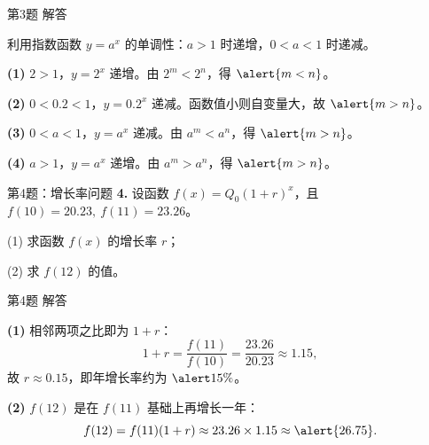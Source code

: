 \documentclass[10pt,aspectratio=169,serif,fleqn]{ctexbeamer}
\begin{document}
\begin{frame}[t]{第3题 解答}
\begin{tcolorbox}[colback=xyyg_orange!5,colframe=xyyg_orange,title=\textbf{解}]
利用指数函数 $y=a^{x}$ 的单调性：$a>1$ 时递增，$0<a<1$ 时递减。

\vspace{0.4em}
\textbf{(1)} $2>1$，$y=2^{x}$ 递增。由 $2^{m}<2^{n}$，得 $\alert{m<n}$。

\vspace{0.4em}
\textbf{(2)} $0<0.2<1$，$y=0.2^{x}$ 递减。函数值小则自变量大，故 $\alert{m>n}$。

\vspace{0.4em}
\textbf{(3)} $0<a<1$，$y=a^{x}$ 递减。由 $a^{m}<a^{n}$，得 $\alert{m>n}$。

\vspace{0.4em}
\textbf{(4)} $a>1$，$y=a^{x}$ 递增。由 $a^{m}>a^{n}$，得 $\alert{m>n}$。
\end{tcolorbox}
\end{frame}

\begin{frame}[t]{第4题：增长率问题}
\textbf{4.} 设函数 $f(x)=Q_{0}(1+r)^{x}$，且 $f(10)=20.23,\ f(11)=23.26$。

(1) 求函数 $f(x)$ 的增长率 $r$；

(2) 求 $f(12)$ 的值。
\end{frame}

\begin{frame}[t]{第4题 解答}
\begin{tcolorbox}[colback=xyyg_orange!5,colframe=xyyg_orange,title=\textbf{解}]
\textbf{(1)} 相邻两项之比即为 $1+r$：
\[
1+r=\frac{f(11)}{f(10)}=\frac{23.26}{20.23}\approx 1.15,
\]
故 $r\approx 0.15$，即年增长率约为 $\alert{15\%}$。

\vspace{0.6em}
\textbf{(2)} $f(12)$ 是在 $f(11)$ 基础上再增长一年：
\[
f(12)=f(11)(1+r)\approx 23.26\times 1.15\approx \alert{26.75}.
\]
\end{tcolorbox}
\end{frame}
\end{document}
